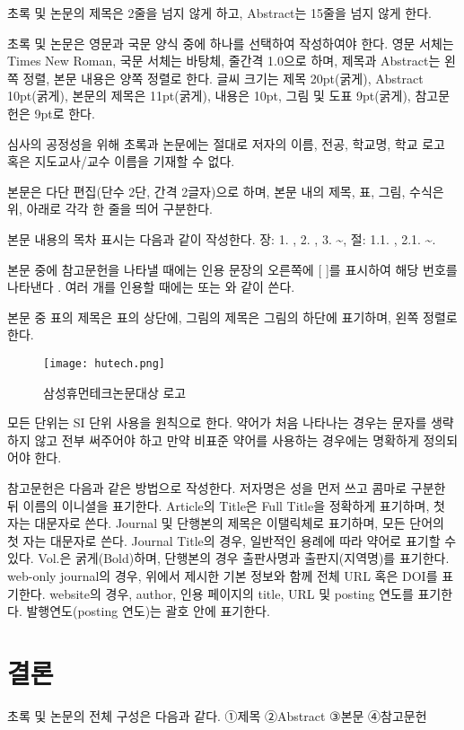 \documentclass[kor]{humantech}
\begin{document}
	초록 및 논문의 제목은 2줄을 넘지 않게 하고, Abstract는 15줄을 넘지 않게 한다.
	
	초록 및 논문은 영문과 국문 양식 중에 하나를 선택하여 작성하여야 한다. 영문 서체는 Times New Roman, 국문 서체는 바탕체, 줄간격 1.0으로 하며, 제목과 Abstract는 왼쪽 정렬, 본문 내용은 양쪽 정렬로 한다. 글씨 크기는 제목 20pt(굵게), Abstract 10pt(굵게), 본문의 제목은 11pt(굵게), 내용은 10pt, 그림 및 도표 9pt(굵게), 참고문헌은 9pt로 한다.
	
	심사의 공정성을 위해 초록과 논문에는 절대로 저자의 이름, 전공, 학교명, 학교 로고 혹은 지도교사/교수 이름을 기재할 수 없다.
	
	본문은 다단 편집(단수 2단, 간격 2글자)으로 하며, 본문 내의 제목, 표, 그림, 수식은 위, 아래로 각각 한 줄을 띄어 구분한다.
	
	본문 내용의 목차 표시는 다음과 같이 작성한다. 장: 1. , 2. , 3. \textasciitilde, 절: 1.1. , 2.1. \textasciitilde.
	
	본문 중에 참고문헌을 나타낼 때에는 인용 문장의 오른쪽에 [ ]를 표시하여 해당 번호를 나타낸다 \cite{schluter2000}. 여러 개를 인용할 때에는 \cite{schluter2000,plazzo2011} 또는 \cite{true2000,schluter2000,plazzo2011}와 같이 쓴다.
	
	본문 중 표의 제목은 표의 상단에, 그림의 제목은 그림의 하단에 표기하며, 왼쪽 정렬로 한다.
	\begin{figure}
		\centering
		\texttt{[image: hutech.png]}
		\caption{삼성휴먼테크논문대상 로고}
	\end{figure}
	모든 단위는 SI 단위 사용을 원칙으로 한다. 약어가 처음 나타나는 경우는 문자를 생략하지 않고 전부 써주어야 하고 만약 비표준 약어를 사용하는 경우에는 명확하게 정의되어야 한다.
	
	참고문헌은 다음과 같은 방법으로 작성한다. 저자명은 성을 먼저 쓰고 콤마로 구분한 뒤 이름의 이니셜을 표기한다. Article의 Title은 Full Title을 정확하게 표기하며, 첫 자는 대문자로 쓴다. Journal 및 단행본의 제목은 이탤릭체로 표기하며, 모든 단어의 첫 자는 대문자로 쓴다. Journal Title의 경우, 일반적인 용례에 따라 약어로 표기할 수 있다.  Vol.은 굵게(Bold)하며, 단행본의 경우 출판사명과 출판지(지역명)를 표기한다. web-only journal의 경우, 위에서 제시한 기본 정보와 함께 전체 URL 혹은 DOI를 표기한다. website의 경우, author, 인용 페이지의 title, URL 및 posting 연도를 표기한다.  발행연도(posting 연도)는 괄호 안에 표기한다.
	
	\section{결론}
	초록 및 논문의 전체 구성은 다음과 같다. ①제목 ②Abstract ③본문 ④참고문헌
	
	\fontsize{9}{9}\selectfont
	
	
\end{document}

